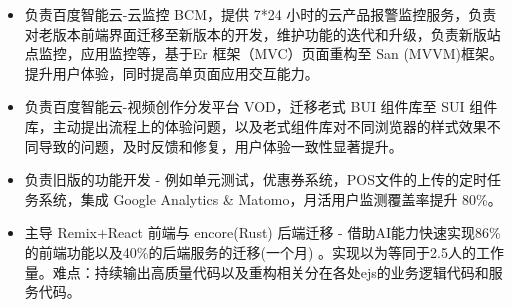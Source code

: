 \documentclass{resume}
\newcommand{\en}[1]{}
\newcommand{\zh}[1]{#1}
\begin{document}
\en{\datedsubsection{\textbf{\href{https://intl.cloud.baidu.com}{Baidu AI Cloud}}, Beijing, China}{01/2021 -- 08/2021}}
\zh{}
\en{\role{ACG Web Construction and Cloud Marketing Department}{Front-End Intern}}
\zh{}
\begin{itemize}
    \item \en{Led development of Baidu AI Cloud-BCM (24×7 cloud monitoring), migrating legacy front-end interfaces, iterating features, and delivering new site \& application monitoring modules. Refactored from Er (MVC) to San (MVVM), boosting UX and single-page interactivity.}
          \zh{负责百度智能云-云监控 BCM，提供 7*24 小时的云产品报警监控服务，负责对老版本前端界面迁移至新版本的开发，维护功能的迭代和升级，负责新版站点监控，应用监控等，基于Er 框架（MVC）页面重构至 San (MVVM)框架。提升用户体验，同时提高单页面应用交互能力。}
    \item \en{Owned Baidu AI Cloud-VOD (Video Creation \& Distribution) migration from legacy BUI to SUI, proactively addressing UX workflow issues and cross-browser style inconsistencies to deliver a markedly more consistent user experience.}
          \zh{负责百度智能云-视频创作分发平台 VOD，迁移老式 BUI 组件库至 SUI 组件库，主动提出流程上的体验问题，以及老式组件库对不同浏览器的样式效果不同导致的问题，及时反馈和修复，用户体验一致性显著提升。}
\end{itemize}

\en{\datedsubsection{\textbf{Absotlute IT}, Australia}{2024/01 -- Present}}
\zh{}
\en{\role{INDOS - Independent Online Solutions}{Full Stack Engineer}}
\zh{}
\begin{itemize}
    \item \en{Implemented legacy system features (EJS/Express), including unit tests, coupon system, scheduled POS file uploads, and Google Analytics \& Matomo integration, increasing monthly active user monitoring coverage by 80\%.}
          \zh{负责旧版的功能开发 - 例如单元测试，优惠券系统，POS文件的上传的定时任务系统，集成 Google Analytics \& Matomo，月活用户监测覆盖率提升 80\%。}
    \item \en{Led migration of front-end (Remix+React) and back-end (encore, Rust) from legacy stack, leveraging AI to accomplish 86\% of front-end and 40\% of back-end migration in one month, equivalent to 2.5 FTE. Challenges included consistently outputting high-quality code and refactoring scattered EJS business/service logic.}
          \zh{主导 Remix+React 前端与 encore(Rust) 后端迁移 - 借助AI能力快速实现86\%的前端功能以及40\%的后端服务的迁移(一个月) 。实现以为等同于2.5人的工作量。难点：持续输出高质量代码以及重构相关分在各处ejs的业务逻辑代码和服务代码。}
\end{itemize}
\end{document}
